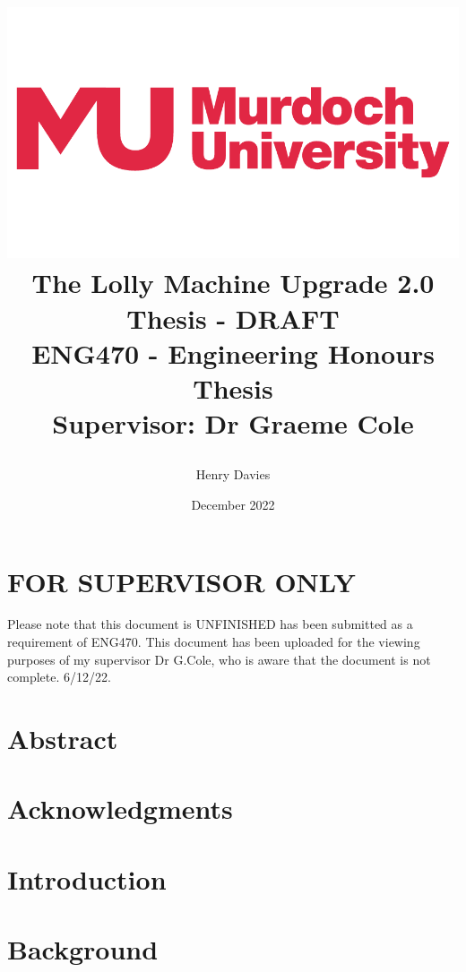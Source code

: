 \documentclass{book}
\title  {\begin{center}
            \includegraphics[scale = 0.2]{murdochLogo} 
            \vspace{10mm}
            \\{\Huge The Lolly Machine Upgrade 2.0}
            \vspace{10mm}
            \\{\Huge Thesis - DRAFT}
            \vspace{5mm}
            \\{\Large ENG470 - Engineering Honours Thesis}
            \vspace{40mm} 
            \\ Supervisor: Dr Graeme Cole
        \end{center}}
\author{Henry Davies}
\date{December 2022}
\begin{document}
\frontmatter

\maketitle
\newpage

\chapter*{FOR SUPERVISOR ONLY}
Please note that this document is UNFINISHED has been submitted as a requirement of ENG470. This document has been uploaded for the viewing purposes of my supervisor Dr G.Cole, who is aware that the document is not complete. 6/12/22.
\newpage

\chapter*{Abstract}


\chapter*{Acknowledgments}



\tableofcontents
{}
\newpage

\listoffigures
{}
\newpage

\printglossary[type=\acronymtype]
\newpage

\mainmatter
\pagestyle{plain}

\chapter{Introduction}
    \label{chap:intro}
    
    \newpage

\chapter{Background}
    \label{chap:background}
    
    \newpage
\end{document}

